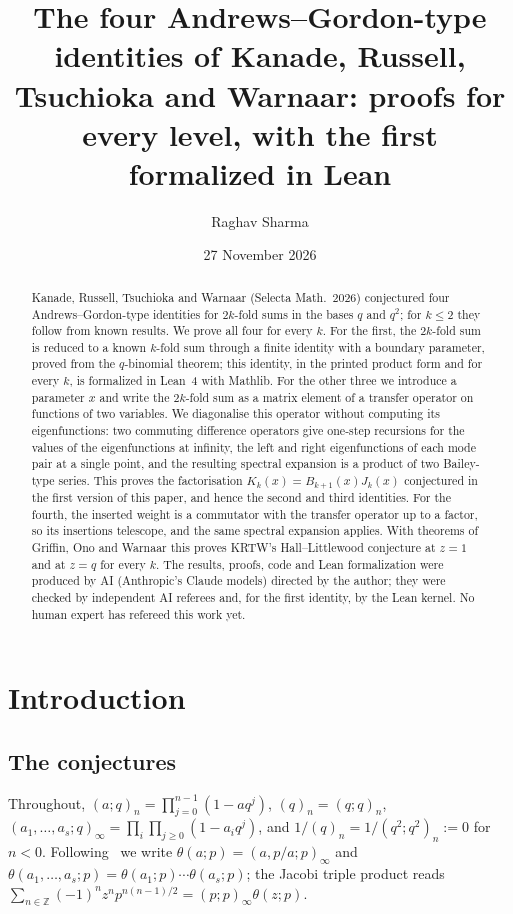 \documentclass[11pt]{amsart}
\title[The four Andrews--Gordon-type identities of KRTW]{The four Andrews--Gordon-type identities of Kanade,
Russell, Tsuchioka and Warnaar: proofs for every level, with the first formalized in Lean}
\author{Raghav Sharma}
\date{27 November 2026}
\theoremstyle{definition}
\numberwithin{equation}{section}
\newcommand{\Z}{\mathbb{Z}}
\begin{document}
\begin{abstract}
Kanade, Russell, Tsuchioka and Warnaar (Selecta Math.\ 2026) conjectured four Andrews--Gordon-type
identities for $2k$-fold sums in the bases $q$ and $q^2$; for $k\le2$ they follow from known results. We prove
all four for every $k$. For the first, the $2k$-fold sum is reduced to a known $k$-fold sum through a finite
identity with a boundary parameter, proved from the $q$-binomial theorem; this identity, in the printed
product form and for every $k$, is formalized in Lean~4 with Mathlib. For the other three we introduce a
parameter $x$ and write the $2k$-fold sum as a matrix element of a transfer operator on functions of two
variables. We diagonalise this operator without computing its eigenfunctions: two commuting difference
operators give one-step recursions for the values of the eigenfunctions at infinity, the left and right
eigenfunctions of each mode pair at a single point, and the resulting spectral expansion is a product of
two Bailey-type series. This proves the factorisation $K_k(x)=B_{k+1}(x)J_k(x)$ conjectured in the first version of
this paper, and hence the second and third identities. For the fourth, the inserted weight is a
commutator with the transfer operator up to a factor, so its insertions telescope, and the same spectral
expansion applies. With theorems of Griffin, Ono and Warnaar this proves KRTW's Hall--Littlewood conjecture
at $z=1$ and at $z=q$ for every $k$. The results, proofs, code and Lean formalization were produced by AI
(Anthropic's Claude models) directed by the author; they were checked by independent AI referees and, for
the first identity, by the Lean kernel. No human expert has refereed this work yet.
\end{abstract}

\maketitle


\section{Introduction}\label{sec:intro}

\subsection{The conjectures}
Throughout, $(a;q)_n=\prod_{j=0}^{n-1}(1-aq^j)$, $(q)_n=(q;q)_n$,
$(a_1,\dots,a_s;q)_\infty=\prod_i\prod_{j\ge0}(1-a_iq^j)$, and $1/(q)_n=1/(q^2;q^2)_n:=0$ for $n<0$. Following~\cite{GOW}
we write $\theta(a;p)=(a,p/a;p)_\infty$ and $\theta(a_1,\dots,a_s;p)=\theta(a_1;p)\cdots\theta(a_s;p)$; the
Jacobi triple product reads $\sum_{n\in\Z}(-1)^nz^np^{n(n-1)/2}=(p;p)_\infty\theta(z;p)$.
\end{document}
